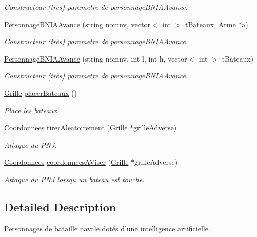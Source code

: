 \begin{DoxyCompactItemize}
\begin{DoxyCompactList}\small\item\em Constructeur (très) parametre de personnage\-B\-N\-I\-A\-Avance. \end{DoxyCompactList}\item 
\hyperlink{classPersonnageBNIAAvance_a9d38388f7558508d80c54d47de851d1d}{Personnage\-B\-N\-I\-A\-Avance} (string nomnv, vector$<$ int $>$ t\-Bateaux, \hyperlink{classArme}{Arme} $\ast$a)
\begin{DoxyCompactList}\small\item\em Constructeur (très) parametre de personnage\-B\-N\-I\-A\-Avance. \end{DoxyCompactList}\item 
\hyperlink{classPersonnageBNIAAvance_a315fa9a64adcbcd808557461c6c8dbc4}{Personnage\-B\-N\-I\-A\-Avance} (string nomnv, int l, int h, vector$<$ int $>$ t\-Bateaux)
\begin{DoxyCompactList}\small\item\em Constructeur (très) parametre de personnage\-B\-N\-I\-A\-Avance. \end{DoxyCompactList}\item 
\hyperlink{classGrille}{Grille} \hyperlink{classPersonnageBNIAAvance_a9b6b532452a97556e50a9d44f19092f3}{placer\-Bateaux} ()
\begin{DoxyCompactList}\small\item\em Place les bateaux. \end{DoxyCompactList}\item 
\hyperlink{classCoordonnees}{Coordonnees} \hyperlink{classPersonnageBNIAAvance_a557435f197cea02489adc236c157f3ff}{tirer\-Aleatoirement} (\hyperlink{classGrille}{Grille} $\ast$grille\-Adverse)
\begin{DoxyCompactList}\small\item\em Attaque du P\-N\-J. \end{DoxyCompactList}\item 
\hyperlink{classCoordonnees}{Coordonnees} \hyperlink{classPersonnageBNIAAvance_a1927c24fe375190ad1d1f96a23c3e060}{coordonnees\-A\-Viser} (\hyperlink{classGrille}{Grille} $\ast$grille\-Adverse)
\begin{DoxyCompactList}\small\item\em Attaque du P\-N\-J lorsqu un bateau est touche. \end{DoxyCompactList}\end{DoxyCompactItemize}


\subsection{Detailed Description}
Personnages de bataille navale dotés d'une intelligence artificielle. 

